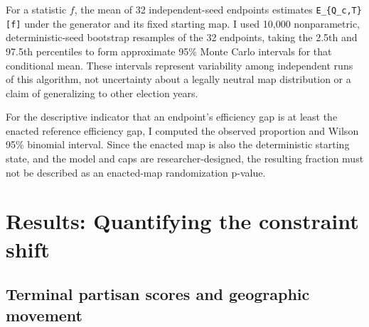 \documentclass[
  10pt,
]{article}
\begin{document}
For a statistic \(f\), the mean of 32 independent-seed endpoints
estimates \texttt{E\_\{Q\_c,T\}{[}f{]}} under the generator and its
fixed starting map. I used 10,000 nonparametric, deterministic-seed
bootstrap resamples of the 32 endpoints, taking the 2.5th and 97.5th
percentiles to form approximate 95\% Monte Carlo intervals for that
conditional mean. These intervals represent variability among
independent runs of this algorithm, not uncertainty about a legally
neutral map distribution or a claim of generalizing to other election
years.

For the descriptive indicator that an endpoint's efficiency gap is at
least the enacted reference efficiency gap, I computed the observed
proportion and Wilson 95\% binomial interval. Since the enacted map is
also the deterministic starting state, and the model and caps are
researcher-designed, the resulting fraction must not be described as an
enacted-map randomization p-value.

\hypertarget{results-quantifying-the-constraint-shift}{%
\section{Results: Quantifying the constraint
shift}\label{results-quantifying-the-constraint-shift}}

\hypertarget{terminal-partisan-scores-and-geographic-movement}{%
\subsection{Terminal partisan scores and geographic
movement}\label{terminal-partisan-scores-and-geographic-movement}}
\end{document}
